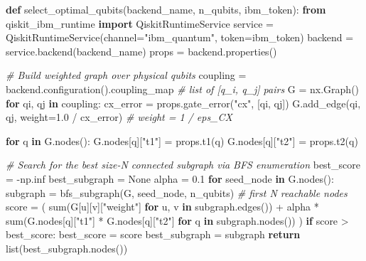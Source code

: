 \documentclass[
  11pt,
]{report}
\newenvironment{Shaded}{}{}
\newcommand{\BuiltInTok}[1]{\textcolor[rgb]{0.00,0.50,0.00}{#1}}
\newcommand{\CommentTok}[1]{\textcolor[rgb]{0.38,0.63,0.69}{\textit{#1}}}
\newcommand{\ControlFlowTok}[1]{\textcolor[rgb]{0.00,0.44,0.13}{\textbf{#1}}}
\newcommand{\FloatTok}[1]{\textcolor[rgb]{0.25,0.63,0.44}{#1}}
\newcommand{\ImportTok}[1]{\textcolor[rgb]{0.00,0.50,0.00}{\textbf{#1}}}
\newcommand{\KeywordTok}[1]{\textcolor[rgb]{0.00,0.44,0.13}{\textbf{#1}}}
\newcommand{\NormalTok}[1]{#1}
\newcommand{\OperatorTok}[1]{\textcolor[rgb]{0.40,0.40,0.40}{#1}}
\newcommand{\StringTok}[1]{\textcolor[rgb]{0.25,0.44,0.63}{#1}}
\newcommand{\VariableTok}[1]{\textcolor[rgb]{0.10,0.09,0.49}{#1}}
\begin{document}
\begin{Shaded}
\begin{Highlighting}[]
\KeywordTok{def}\NormalTok{ select\_optimal\_qubits(backend\_name, n\_qubits, ibm\_token):}
    \ImportTok{from}\NormalTok{ qiskit\_ibm\_runtime }\ImportTok{import}\NormalTok{ QiskitRuntimeService}
\NormalTok{    service }\OperatorTok{=}\NormalTok{ QiskitRuntimeService(channel}\OperatorTok{=}\StringTok{"ibm\_quantum"}\NormalTok{, token}\OperatorTok{=}\NormalTok{ibm\_token)}
\NormalTok{    backend }\OperatorTok{=}\NormalTok{ service.backend(backend\_name)}
\NormalTok{    props }\OperatorTok{=}\NormalTok{ backend.properties()}

    \CommentTok{\# Build weighted graph over physical qubits}
\NormalTok{    coupling }\OperatorTok{=}\NormalTok{ backend.configuration().coupling\_map   }\CommentTok{\# list of [q\_i, q\_j] pairs}
\NormalTok{    G }\OperatorTok{=}\NormalTok{ nx.Graph()}
    \ControlFlowTok{for}\NormalTok{ qi, qj }\KeywordTok{in}\NormalTok{ coupling:}
\NormalTok{        cx\_error }\OperatorTok{=}\NormalTok{ props.gate\_error(}\StringTok{"cx"}\NormalTok{, [qi, qj])}
\NormalTok{        G.add\_edge(qi, qj, weight}\OperatorTok{=}\FloatTok{1.0} \OperatorTok{/}\NormalTok{ cx\_error)    }\CommentTok{\# weight = 1 / eps\_CX}

    \ControlFlowTok{for}\NormalTok{ q }\KeywordTok{in}\NormalTok{ G.nodes():}
\NormalTok{        G.nodes[q][}\StringTok{"t1"}\NormalTok{] }\OperatorTok{=}\NormalTok{ props.t1(q)}
\NormalTok{        G.nodes[q][}\StringTok{"t2"}\NormalTok{] }\OperatorTok{=}\NormalTok{ props.t2(q)}

    \CommentTok{\# Search for the best size{-}N connected subgraph via BFS enumeration}
\NormalTok{    best\_score }\OperatorTok{=} \OperatorTok{{-}}\NormalTok{np.inf}
\NormalTok{    best\_subgraph }\OperatorTok{=} \VariableTok{None}
\NormalTok{    alpha }\OperatorTok{=} \FloatTok{0.1}
    \ControlFlowTok{for}\NormalTok{ seed\_node }\KeywordTok{in}\NormalTok{ G.nodes():}
\NormalTok{        subgraph }\OperatorTok{=}\NormalTok{ bfs\_subgraph(G, seed\_node, n\_qubits)   }\CommentTok{\# first N reachable nodes}
\NormalTok{        score }\OperatorTok{=}\NormalTok{ (}
            \BuiltInTok{sum}\NormalTok{(G[u][v][}\StringTok{"weight"}\NormalTok{] }\ControlFlowTok{for}\NormalTok{ u, v }\KeywordTok{in}\NormalTok{ subgraph.edges())}
            \OperatorTok{+}\NormalTok{ alpha }\OperatorTok{*} \BuiltInTok{sum}\NormalTok{(G.nodes[q][}\StringTok{"t1"}\NormalTok{] }\OperatorTok{*}\NormalTok{ G.nodes[q][}\StringTok{"t2"}\NormalTok{]}
                          \ControlFlowTok{for}\NormalTok{ q }\KeywordTok{in}\NormalTok{ subgraph.nodes())}
\NormalTok{        )}
        \ControlFlowTok{if}\NormalTok{ score }\OperatorTok{\textgreater{}}\NormalTok{ best\_score:}
\NormalTok{            best\_score }\OperatorTok{=}\NormalTok{ score}
\NormalTok{            best\_subgraph }\OperatorTok{=}\NormalTok{ subgraph}
    \ControlFlowTok{return} \BuiltInTok{list}\NormalTok{(best\_subgraph.nodes())}
\end{Highlighting}
\end{Shaded}
\end{document}
